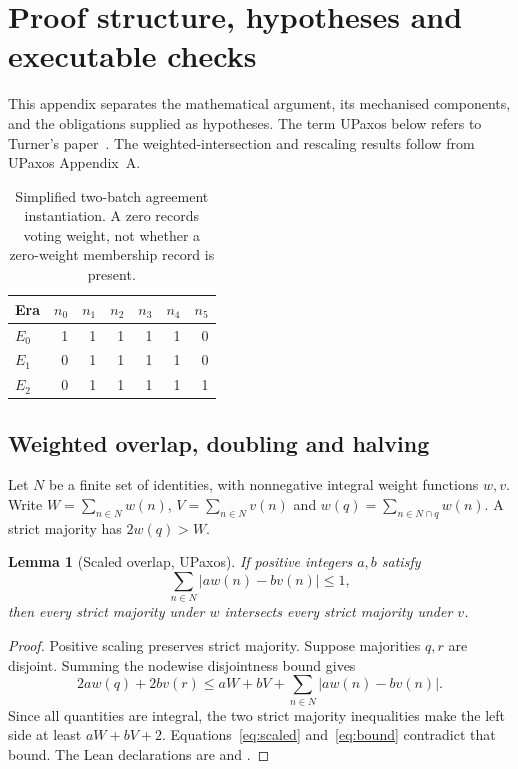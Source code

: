 \documentclass[10pt,journal,letterpaper]{IEEEtran}
\newtheorem{lemma}{Lemma}
\begin{document}
\appendices
\section{Proof structure, hypotheses and executable checks}\label{app:proof}
This appendix separates the mathematical argument, its mechanised components, and the obligations supplied as hypotheses. The term UPaxos below refers to Turner's paper~\cite{turner}. The weighted-intersection and rescaling results follow from UPaxos Appendix~A.

\begin{table}[t]
\centering
\caption{Simplified two-batch agreement instantiation. A zero records voting weight, not whether a zero-weight membership record is present.}
\label{tab:agreementweights}
\begin{tabular}{lrrrrrr}
\toprule
Era & $n_0$ & $n_1$ & $n_2$ & $n_3$ & $n_4$ & $n_5$\\
\midrule
$E_0$ & 1&1&1&1&1&0\\
$E_1$ & 0&1&1&1&1&0\\
$E_2$ & 0&1&1&1&1&1\\
\bottomrule
\end{tabular}
\end{table}

\subsection{Weighted overlap, doubling and halving}
Let $N$ be a finite set of identities, with nonnegative integral weight functions $w,v$. Write $W=\sum_{n\in N}w(n)$, $V=\sum_{n\in N}v(n)$ and $w(q)=\sum_{n\in N\cap q}w(n)$. A strict majority has $2w(q)>W$.
\begin{lemma}[Scaled overlap, UPaxos]\label{lem:scaled}
If positive integers $a,b$ satisfy
\begin{equation}
\sum_{n\in N}|a w(n)-b v(n)|\leq 1,
\label{eq:scaled}
\end{equation}
then every strict majority under $w$ intersects every strict majority under $v$.
\end{lemma}
\begin{proof}
Positive scaling preserves strict majority. Suppose majorities $q,r$ are disjoint. Summing the nodewise disjointness bound gives
\begin{equation}
2a w(q)+2b v(r)\leq aW+bV+\sum_{n\in N}|a w(n)-b v(n)|.
\label{eq:bound}
\end{equation}
Since all quantities are integral, the two strict majority inequalities make the left side at least $aW+bV+2$. Equations~\eqref{eq:scaled} and~\eqref{eq:bound} contradict that bound. The Lean declarations are  and .
\end{proof}
\end{document}
